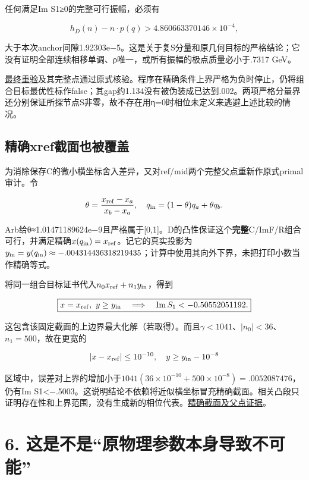 \documentclass[
  10pt,
  a4paper,
]{article}
\begin{document}
任何满足Im S1≥0的完整可行振幅，必须有

\[h_D(n)-n\cdot p(q)>4.860663370146\times10^{-4},\]

大于本次anchor间隙1.92303e−5。这是关于复S分量和原几何目标的严格结论；它没有证明全部连续相移单调、ρ唯一，或所有振幅的极点质量必小于.7317
GeV。

\href{../ref_P1_certificate_final/probe.json}{最终重验}及其完整点通过原式核验。程序在精确条件上界严格为负时停止，仍将组合目标最优性标作false；其gap约1.134没有被伪装成已达到.002。两项严格分量界还分别保证所探节点S非零，故不存在用η=0时相位未定义来逃避上述比较的情况。

\subsection{精确xref截面也被覆盖}\label{ux7cbeux786exrefux622aux9762ux4e5fux88abux8986ux76d6}

为消除保存C的微小横坐标舍入差异，又对ref/mid两个完整父点重新作原式primal审计。令

\[\theta=\frac{x_{\rm ref}-x_a}{x_b-x_a},\quad
q_{\rm in}=(1-\theta)q_a+\theta q_b.\]

Arb给θ≈1.01471189624e−9且严格属于{[}0,1{]}。D的凸性保证这个\textbf{完整}C/ImF/R组合可行，并满足精确\(x(q_{\rm in})=x_{\rm ref}\)。记它的真实投影为\(y_{\rm in}=y(q_{\rm in})\approx-.004314436318219435\)；计算中使用其向外下界，未把打印小数当作精确等式。

将同一组合目标证书代入\(n_0x_{\rm ref}+n_1y_{\rm in}\)，得到

\[\boxed{x=x_{\rm ref},\ y\ge y_{\rm in}
\quad\Longrightarrow\quad\operatorname{Im}S_1<-0.50552051192.}\]

这包含该固定截面的上边界最大化解（若取得）。而且\(\gamma<1041\)、\(|n_0|<36\)、\(n_1=500\)，故在更宽的

\[|x-x_{\rm ref}|\le10^{-10},\quad y\ge y_{\rm in}-10^{-8}\]

区域中，误差对上界的增加小于\(1041(36\times10^{-10}+500\times10^{-8})=.0052087476\)，仍有Im
S1\textless−.5003。这说明结论不依赖将近似横坐标冒充精确截面。相关凸段只证明存在性和上界范围，没有生成新的相位代表。\href{../ref_P1_exact_section/probe.json}{精确截面及父点证据}。

\section{6.
这是不是``原物理参数本身导致不可能''}\label{ux8fd9ux662fux4e0dux662fux539fux7269ux7406ux53c2ux6570ux672cux8eabux5bfcux81f4ux4e0dux53efux80fd}
\end{document}

